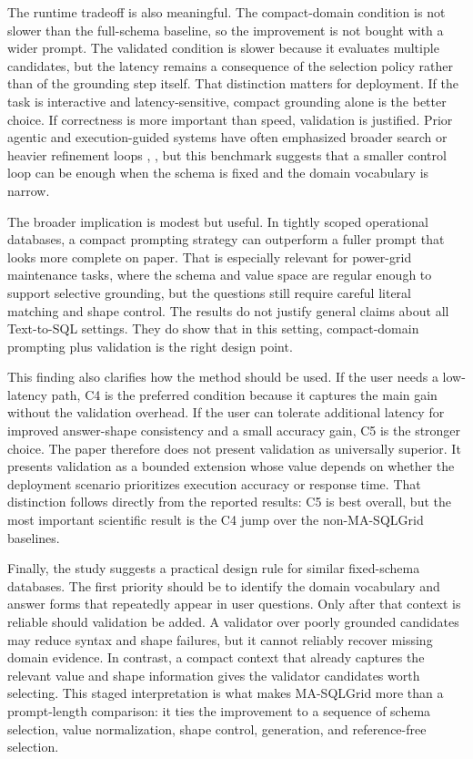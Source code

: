 \documentclass{ieeeaccess}
\begin{document}
The runtime tradeoff is also meaningful. The compact-domain condition is not slower than the full-schema baseline, so the improvement is not bought with a wider prompt. The validated condition is slower because it evaluates multiple candidates, but the latency remains a consequence of the selection policy rather than of the grounding step itself. That distinction matters for deployment. If the task is interactive and latency-sensitive, compact grounding alone is the better choice. If correctness is more important than speed, validation is justified. Prior agentic and execution-guided systems have often emphasized broader search or heavier refinement loops \cite{wang2023macsql}, \cite{pourreza2024chasesql}, but this benchmark suggests that a smaller control loop can be enough when the schema is fixed and the domain vocabulary is narrow.

The broader implication is modest but useful. In tightly scoped operational databases, a compact prompting strategy can outperform a fuller prompt that looks more complete on paper. That is especially relevant for power-grid maintenance tasks, where the schema and value space are regular enough to support selective grounding, but the questions still require careful literal matching and shape control. The results do not justify general claims about all Text-to-SQL settings. They do show that in this setting, compact-domain prompting plus validation is the right design point.

This finding also clarifies how the method should be used. If the user needs a low-latency path, C4 is the preferred condition because it captures the main gain without the validation overhead. If the user can tolerate additional latency for improved answer-shape consistency and a small accuracy gain, C5 is the stronger choice. The paper therefore does not present validation as universally superior. It presents validation as a bounded extension whose value depends on whether the deployment scenario prioritizes execution accuracy or response time. That distinction follows directly from the reported results: C5 is best overall, but the most important scientific result is the C4 jump over the non-MA-SQLGrid baselines.

Finally, the study suggests a practical design rule for similar fixed-schema databases. The first priority should be to identify the domain vocabulary and answer forms that repeatedly appear in user questions. Only after that context is reliable should validation be added. A validator over poorly grounded candidates may reduce syntax and shape failures, but it cannot reliably recover missing domain evidence. In contrast, a compact context that already captures the relevant value and shape information gives the validator candidates worth selecting. This staged interpretation is what makes MA-SQLGrid more than a prompt-length comparison: it ties the improvement to a sequence of schema selection, value normalization, shape control, generation, and reference-free selection.
\end{document}
